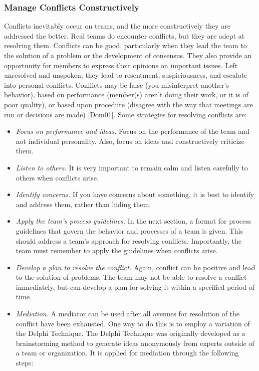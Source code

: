 \subsubsection{Manage Conflicts
Constructively}\label{manage-conflicts-constructively}

Conflicts inevitably occur on teams, and the more constructively they
are addressed the better. Real teams do encounter conflicts, but they
are adept at resolving them. Conflicts can be good, particularly when
they lead the team to the solution of a problem or the development of
consensus. They also provide an opportunity for members to express their
opinions on important issues. Left unresolved and unspoken, they lead to
resentment, suspiciousness, and escalate into personal conflicts.
Conflicts may be false (you misinterpret another's behavior), based on
performance (member(s) aren't doing their work, or it is of poor
quality), or based upon procedure (disagree with the way that meetings
are run or decisions are made) {[}Dom01{]}. Some strategies for
resolving conflicts are:

\begin{itemize}
\item
  \emph{Focus on performance and ideas.} Focus on the performance of the
  team and not individual personality. Also, focus on ideas and
  constructively criticize them.
\item
  \emph{Listen to others.} It is very important to remain calm and
  listen carefully to others when conflicts arise.
\item
  \emph{Identify concerns.} If you have concerns about something, it is
  best to identify and address them, rather than hiding them.
\item
  \emph{Apply the team's process guidelines.} In the next section, a
  format for process guidelines that govern the behavior and processes
  of a team is given. This should address a team's approach for
  resolving conflicts. Importantly, the team must remember to apply the
  guidelines when conflicts arise.
\item
  \emph{Develop a plan to resolve the conflict.} Again, conflict can be
  positive and lead to the solution of problems. The team may not be
  able to resolve a conflict immediately, but can develop a plan for
  solving it within a specified period of time.
\item
  \emph{Mediation.} A mediator can be used after all avenues for
  resolution of the conflict have been exhausted. One way to do this is
  to employ a variation of the Delphi Technique. The Delphi Technique
  was originally developed as a brainstorming method to generate ideas
  anonymously from experts outside of a team or organization. It is
  applied for mediation through the following steps:
\end{itemize}

